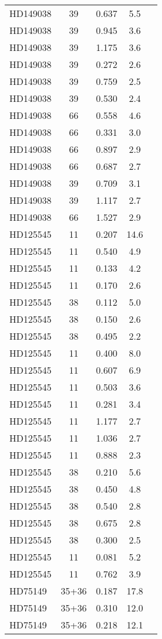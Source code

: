 \begin{table*}
\begin{tabular}{l c c c c}
HD149038 & 39 & 0.637 & 5.5\\ 
HD149038 & 39 & 0.945 & 3.6\\ 
HD149038 & 39 & 1.175 & 3.6\\ 
HD149038 & 39 & 0.272 & 2.6\\ 
HD149038 & 39 & 0.759 & 2.5\\ 
HD149038 & 39 & 0.530 & 2.4\\ 
HD149038 & 66 & 0.558 & 4.6\\ 
HD149038 & 66 & 0.331 & 3.0\\ 
HD149038 & 66 & 0.897 & 2.9\\ 
HD149038 & 66 & 0.687 & 2.7\\ 
HD149038 & 39 & 0.709 & 3.1\\ 
HD149038 & 39 & 1.117 & 2.7\\ 
HD149038 & 66 & 1.527 & 2.9\\ 
\hline
HD125545 & 11 & 0.207 & 14.6\\ 
HD125545 & 11 & 0.540 & 4.9\\ 
HD125545 & 11 & 0.133 & 4.2\\ 
HD125545 & 11 & 0.170 & 2.6\\ 
HD125545 & 38 & 0.112 & 5.0\\ 
HD125545 & 38 & 0.150 & 2.6\\ 
HD125545 & 38 & 0.495 & 2.2\\ 
HD125545 & 11 & 0.400 & 8.0\\ 
HD125545 & 11 & 0.607 & 6.9\\ 
HD125545 & 11 & 0.503 & 3.6\\ 
HD125545 & 11 & 0.281 & 3.4\\ 
HD125545 & 11 & 1.177 & 2.7\\ 
HD125545 & 11 & 1.036 & 2.7\\ 
HD125545 & 11 & 0.888 & 2.3\\ 
HD125545 & 38 & 0.210 & 5.6\\ 
HD125545 & 38 & 0.450 & 4.8\\ 
HD125545 & 38 & 0.540 & 2.8\\ 
HD125545 & 38 & 0.675 & 2.8\\ 
HD125545 & 38 & 0.300 & 2.5\\ 
HD125545 & 11 & 0.081 & 5.2\\ 
HD125545 & 11 & 0.762 & 3.9\\ 
\hline
HD75149 & 35+36 & 0.187 & 17.8\\ 
HD75149 & 35+36 & 0.310 & 12.0\\ 
HD75149 & 35+36 & 0.218 & 12.1\\ 

\end{tabular}
\end{table*}
